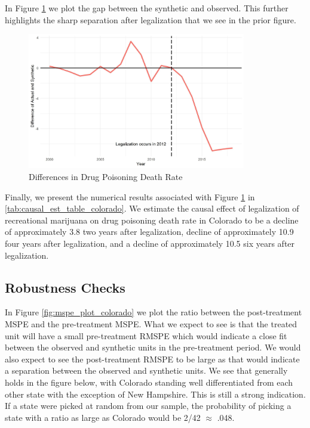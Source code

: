 \documentclass{article}
\begin{document}
In Figure \ref{fig:diffs_plot_colorado} we plot the gap between the synthetic and observed. This further highlights the sharp separation after legalization that we see in the prior figure.

\begin{figure}[H]
	\begin{center}
		\includegraphics[width=0.85\textwidth]{diffs_plot_colorado}
	\end{center}
	\caption{Differences in Drug Poisoning Death Rate}
	\label{fig:diffs_plot_colorado}
\end{figure}

Finally, we present the numerical results associated with Figure \ref{fig:diffs_plot_colorado} in \ref{tab:causal_est_table_colorado}. We estimate the causal effect of legalization of recreational marijuana on drug poisoning death rate in Colorado to be a decline of approximately 3.8 two years after legalization, decline of approximately 10.9 four years after legalization, and a decline of approximately 10.5 six years after legalization.



\subsection{Robustness Checks}

In Figure \ref{fig:mspe_plot_colorado} we plot the ratio between the post-treatment MSPE and the pre-treatment MSPE. What we expect to see is that the treated unit will have a small pre-treatment RMSPE which would indicate a close fit between the observed and synthetic units in the pre-treatment period. We would also expect to see the post-treatment RMSPE to be large as that would indicate a separation between the observed and synthetic units. We see that generally holds in the figure below, with Colorado standing well differentiated from each other state with the exception of New Hampshire. This is still a strong indication. If a state were picked at random from our sample, the probability of picking a state with a ratio as large as Colorado would be 2/42 $\approx$ .048.
\end{document}

